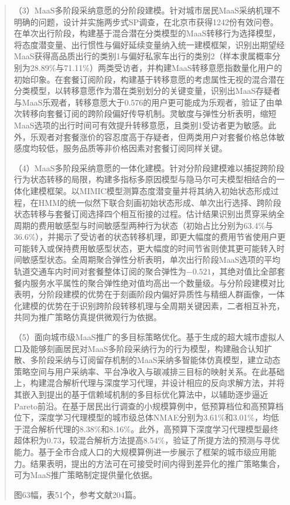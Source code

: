 \begin{abstract}
（3）MaaS多阶段采纳意愿的分阶段建模。针对城市居民MaaS采纳机理不明确的问题，设计并实施两步式SP调查，在北京市获得1242份有效问卷。在单次出行阶段，构建基于混合潜在分类模型的MaaS转移行为选择模型，将态度潜变量、出行惯性与偏好延续变量纳入统一建模框架，识别出期望经MaaS获得高品质出行的类别1与偏好私家车出行的类别2（样本隶属概率分别为28.89\%与71.11\%）两类受访者，并构建MaaS转移意愿指数量化用户的初始印象。在套餐订阅阶段，构建基于转移意愿的考虑属性无视的混合潜在分类模型，以转移意愿作为潜在类别划分的关键变量，识别出MaaS存疑者与MaaS乐观者，转移意愿大于0.576的用户更可能成为乐观者，验证了由单次转移向套餐订阅的跨阶段偏好传导机制。灵敏度与弹性分析表明，缩短MaaS选项的出行时间可有效提升转移意愿，且类别1受访者更为敏感。此外，乐观者对套餐涨价的容忍度高于存疑者，但两类用户对套餐价格总体敏感度均较低，服务品质等非价格因素对套餐订阅同样关键。

（4）MaaS多阶段采纳意愿的一体化建模。针对分阶段建模难以捕捉跨阶段行为状态转移的局限，构建多指标多原因模型与隐马尔可夫模型相结合的一体化建模框架。以MIMIC模型测算态度潜变量并将其纳入初始状态形成过程，在HMM的统一似然下联合刻画初始状态形成、单次出行选择、跨阶段状态转移与套餐订阅选择四个相互衔接的过程。估计结果识别出贯穿采纳全周期的费用敏感型与时间敏感型两种行为状态（初始占比分别为63.4\%与36.6\%），并揭示了受访者的状态转移机理，即更大幅度的费用节省使用户更可能转入或保持费用敏感型状态，更大幅度的时间节省则使其更可能转入时间敏感型状态。全周期聚合弹性分析表明，单次出行阶段MaaS选项的平均轨道交通车内时间对套餐整体订阅的聚合弹性为$-0.521$，其绝对值比全部套餐内服务水平属性的聚合弹性绝对值均高出一个数量级。与分阶段建模对比表明，分阶段建模的优势在于刻画阶段内偏好异质性与精细人群画像，一体化建模的优势在于识别跨阶段转移机理与全周期关键因素，二者相互补充，共同为推广策略仿真提供微观行为依据。

（5）面向城市级MaaS推广的多目标策略优化。基于生成的超大城市虚拟人口及能够刻画居民对MaaS多阶段采纳行为的行为模型，构建融合认知扩散、多阶段采纳与订阅留存机制的MaaS采纳多智能体仿真模型，建立动态策略空间与用户采纳率、平台净收入与碳减排三目标的映射关系。在此基础上，构建混合解析代理与深度学习代理，并设计相应的反向求解方法，并将其嵌入到提出的基于信赖域机制的多目标优化算法中，以辅助逐步逼近Pareto前沿。在基于居民出行调查的小规模算例中，低预算档位和高预算档位下，深度学习代理模型的城市级总体NMAE分别为3.61\%和3.01\%，均低于混合解析代理的8.38\%和8.16\%。此外，高预算下深度学习代理模型最终超体积为0.73，较混合解析方法提高8.54\%，验证了所提方法的预测与寻优能力。基于全市合成人口的大规模算例进一步展示了框架的城市级应用能力。结果表明，提出的方法可在可接受时间内得到差异化的推广策略集合，可为MaaS推广策略制定提供量化依据。

图63幅，表51个，参考文献204篇。

	\noindent{}
\end{abstract}
